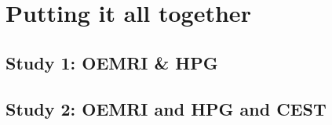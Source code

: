 
\chapter{Putting it all together}
\label{ch:meltingpot}

\section{Study 1: OEMRI \& HPG}


\section{Study 2: OEMRI and HPG and CEST} 

\endinput